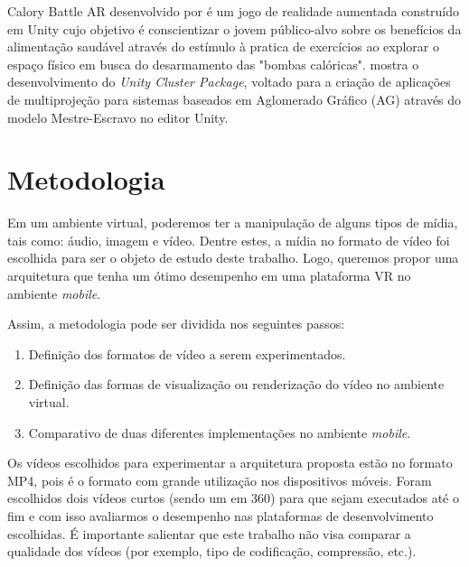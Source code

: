 \documentclass[sigconf]{acmart}
\begin{document}
Calory Battle AR desenvolvido por \cite{kim2014using} é um jogo de realidade aumentada construído em Unity cujo objetivo é conscientizar o jovem público-alvo sobre os benefícios da alimentação saudável através do estímulo à pratica de exercícios ao explorar o espaço físico em busca do desarmamento das "bombas calóricas".
\cite{sv2015popolin} mostra o desenvolvimento do \textit{Unity Cluster Package}, voltado para a criação de aplicações de multiprojeção para sistemas baseados em Aglomerado Gráfico (AG) através do modelo Mestre-Escravo no editor Unity.


\section{Metodologia} \label{sec-methodology}


Em um ambiente virtual, poderemos ter a manipulação de alguns tipos de mídia, tais como: áudio, imagem e vídeo. Dentre estes, a mídia no formato de vídeo foi escolhida para ser o objeto de estudo deste trabalho. Logo, queremos propor uma arquitetura que tenha um ótimo desempenho em uma plataforma VR no ambiente \textit{mobile}.

Assim, a metodologia pode ser dividida nos seguintes passos:

\begin{enumerate}
    \item Definição dos formatos de vídeo a serem experimentados.
    \item Definição das formas de visualização ou renderização do vídeo no ambiente virtual.
    \item Comparativo de duas diferentes implementações no ambiente \textit{mobile}.
\end{enumerate}

Os vídeos escolhidos para experimentar a arquitetura proposta estão no formato MP4, pois é o formato com grande utilização nos dispositivos móveis. Foram escolhidos dois vídeos curtos (sendo um em 360\degree) para que sejam executados até o fim e com isso avaliarmos o desempenho nas plataformas de desenvolvimento escolhidas. É importante salientar que este trabalho não visa comparar a qualidade dos vídeos (por exemplo, tipo de codificação, compressão, etc.).
\end{document}
